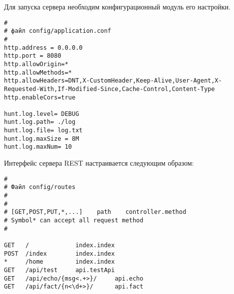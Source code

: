 \documentclass{studrep}
\begin{document}
Для запуска сервера необходим конфигурационный модуль его настройки.
\begin{verbatim}
#
# файл config/application.conf
#
http.address = 0.0.0.0
http.port = 8080
http.allowOrigin=*
http.allowMethods=*
http.allowHeaders=DNT,X-CustomHeader,Keep-Alive,User-Agent,X-Requested-With,If-Modified-Since,Cache-Control,Content-Type
http.enableCors=true

hunt.log.level= DEBUG
hunt.log.path= ./log
hunt.log.file= log.txt
hunt.log.maxSize = 8M
hunt.log.maxNum= 10
\end{verbatim}

Интерфейс сервера REST настраивается следующим образом:
\begin{verbatim}
#
# Файл config/routes
#
#
# [GET,POST,PUT,*,...]    path    controller.method
# Symbol* can accept all request method
#

GET   /             index.index
POST  /index        index.index
*     /home         index.index
GET   /api/test     api.testApi
GET   /api/echo/{msg<.+>}/     api.echo
GET   /api/fact/{n<\d+>}/      api.fact
\end{verbatim}
\end{document}
